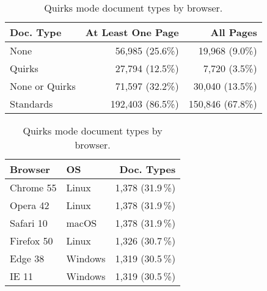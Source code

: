 \begin{table}[t]
\centering
\begin{minipage}[t]{.55\textwidth}
    \caption{Summary of document type usage in sites.\newline}
    \label{rpo:tab:doctypes_summary}
    \centering
    \footnotesize
    \begin{tabular}{lrr}
    \toprule
    \textbf{Doc. Type} & \textbf{At Least One Page} & \textbf{All Pages} \\
    \midrule

    None & 56,985 (25.6\%) & 19,968 (9.0\%) \\
    Quirks & 27,794 (12.5\%) & 7,720 (3.5\%) \\
    None or Quirks & 71,597 (32.2\%) & 30,040 (13.5\%) \\
    \addlinespace
    Standards & 192,403 (86.5\%) & 150,846 (67.8\%) \\    
    \bottomrule
    \end{tabular}
\end{minipage}
\hfill
\begin{minipage}[t]{.43\textwidth}
    \caption{Quirks mode document types by browser.}
    \label{rpo:tab:doctypes_browsers}
    \centering
    \footnotesize
    \begin{tabular}{llr}
    \toprule

    \textbf{Browser} &
    \textbf{OS} &
    \textbf{Doc. Types} \\

    \midrule
    Chrome 55 & Linux & 1,378 (31.9\,\%) \\
    Opera 42 & Linux & 1,378 (31.9\,\%) \\
    Safari 10 & macOS & 1,378 (31.9\,\%) \\
    \addlinespace
    Firefox 50 & Linux & 1,326 (30.7\,\%) \\
    \addlinespace
    Edge 38 & Windows & 1,319 (30.5\,\%) \\
    IE 11 & Windows & 1,319 (30.5\,\%) \\
    \bottomrule
    \end{tabular}
\end{minipage}
\end{table}
